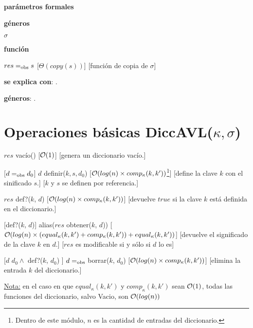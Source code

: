 \begin{Interfaz}
  \textbf{parámetros formales}\parindent\\
  \parbox{1.7cm}{\textbf{géneros}} $\sigma$\\
  \parbox[t]{1.7cm}{\textbf{función}}\parbox[t]{\textwidth-2\parindent-1.7cm}{    	
    {$res =_{\mathrm{obs}} s$}
    [$\Theta(copy(s))$]
    [función de copia de $\sigma$]
    }
      
  \textbf{se explica con}: .

  \textbf{géneros}: .

  \section*{Operaciones básicas DiccAVL($\kappa, \sigma$)}

  {$res$ \igobs vacío()}
  [$\mathcal{O}(1)$]
  [genera un diccionario vacío.]

  [$d =_{\mathrm{obs}} d_0$]  
  {$d$ \igobs definir($k, s, d_0$)}
  [$\mathcal{O}(log(n) \times comp_{\kappa}(k, k'))$\footnote{Dentro de este módulo, $n$ es la cantidad de entradas del diccionario.}]
  [define la clave $k$ con el sinificado $s$.]
  [$k$ y $s$ se definen por referencia.]
    
  {$res$ \igobs def?($k$, $d$) }
  [$\mathcal{O}(log(n) \times comp_{\kappa}(k, k'))$]
  [devuelve $true$ si la clave $k$ está definida en el diccionario.]
  
  [def?($k$, $d$)]  
  {alias($res$ \igobs obtener($k$, $d$))}
  [$\mathcal{O}(log(n) \times (equal_{\kappa}(k, k') + comp_{\kappa}(k, k')) + equal_{\kappa}(k, k'))$]
  [devuelve el significado de la clave $k$ en $d$.]
  [$res$ es modificable si y sólo si $d$ lo es]
  
  [$d$ \igobs $d_0 \land$ def?($k$, $d_0$) ]
  {$d =_{\mathrm{obs}}$ borrar($k$, $d_0$)}
  [$\mathcal{O}(log(n) \times comp_{\kappa}(k, k'))$]
  [elimina la entrada $k$ del diccionario.] 
  
  \underline{Nota:} en el caso en que $equal_{\kappa}(k, k')$ y $comp_{\kappa}(k, k')$ sean $\mathcal{O}(1)$, todas las funciones del diccionario, salvo Vacio, son $\mathcal{O}(log(n))$
  \clearpage
\end{Interfaz}

